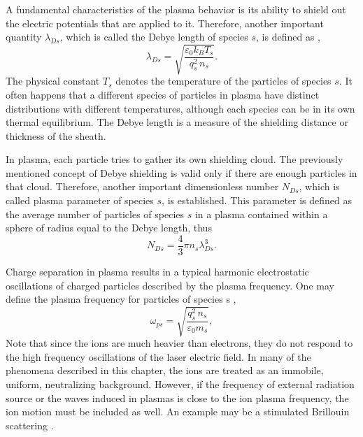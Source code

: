 A fundamental characteristics of the plasma behavior is its ability to shield out the electric potentials that are applied to it. Therefore, another important quantity $ \lambda_{Ds} $, which is called the Debye length of species $ s $, is defined as \cite{Chen1984},
\begin{equation}
\label{2.1.3}
\lambda_{Ds} = \sqrt{\frac{\varepsilon_0 k_B T_s}{q_s^2 \, n_s}}.
\end{equation}
The physical constant $ T_s $ denotes the temperature of the particles of species $ s $. It often happens that a different species of particles in plasma have distinct distributions with different temperatures, although each species can be in its own thermal equilibrium. The Debye length is a measure of the shielding distance or thickness of the sheath.

In plasma, each particle tries to gather its own shielding cloud. The previously mentioned concept of Debye shielding is valid only if there are enough particles in that cloud. Therefore, another important dimensionless number $ N_{Ds} $, which is called plasma parameter of species $ s $, is established. This parameter is defined as the average number of particles of species $ s $ in a plasma contained within a sphere of radius equal to the Debye length, thus \cite{Chen1984}
\begin{equation}
\label{2.1.4}
N_{Ds} = \frac{4}{3} \pi n_s \lambda_{Ds}^3. 
\end{equation}

Charge separation in plasma results in a typical harmonic electrostatic oscillations of charged particles described by the plasma frequency. One may define the plasma frequency for particles of species s \cite{Chen1984},
\begin{equation}
\label{2.1.5}
\omega_{ps} = \sqrt{\frac{q_s^{2}\,n_s}{\varepsilon_0 m_s}},
\end{equation}
Note that since the ions are much heavier than electrons, they do not respond to the high frequency oscillations of the laser electric field. In many of the phenomena described in this chapter, the ions are treated as an immobile, uniform, neutralizing background. However, if the frequency of external radiation source or the waves induced in plasmas is close to the ion plasma frequency, the ion motion must be included as well. An example may be a stimulated Brillouin scattering \cite{kruer}.

